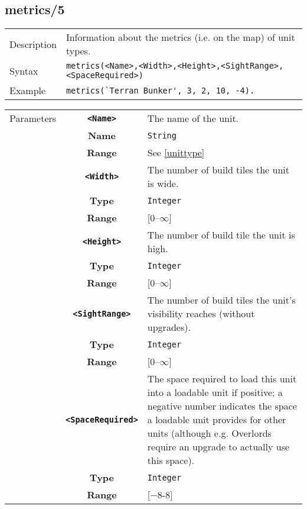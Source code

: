 \subsection{metrics/5}
\begin{tabularx}{\textwidth}{lX}
 Description & Information about the metrics (i.e. on the map) of unit types. \\
 Syntax & \verb|metrics(<Name>,<Width>,<Height>,<SightRange>,<SpaceRequired>)| \\
 Example & \verb|metrics(`Terran Bunker', 3, 2, 10, -4).| \\
 \end{tabularx}
 \begin{tabularx}{\textwidth}{l | c | p{8cm}|}
 \cline{2-3}
 Parameters & \textbf{\verb|<Name>|} & The name of the unit.\\
            & \textbf{Name} & \verb|String| \\
            & \textbf{Range} & See \ref{unittype} \\
            \cline{2-3}
            & \textbf{\verb|<Width>|} & The number of build tiles the unit is wide.\\
            & \textbf{Type} & \verb|Integer| \\
            & \textbf{Range} & [0--$\infty$] \\
            \cline{2-3}
            & \textbf{\verb|<Height>|} & The number of build tile the unit is high.\\
            & \textbf{Type} & \verb|Integer| \\
            & \textbf{Range} & [0--$\infty$] \\
            \cline{2-3}
            & \textbf{\verb|<SightRange>|} & The number of build tiles the unit's visibility reaches (without upgrades). \\
            & \textbf{Type} & \verb|Integer| \\
            & \textbf{Range} & [0--$\infty$] \\
            \cline{2-3}
            & \textbf{\verb|<SpaceRequired>|} & The space required to load this unit into a loadable unit if positive; a negative number indicates the space a loadable unit provides for other units (although e.g. Overlords require an upgrade to actually use this space).\\
            & \textbf{Type} & \verb|Integer| \\
            & \textbf{Range} & [$-$8-8] \\
            \cline{2-3}
\end{tabularx}

